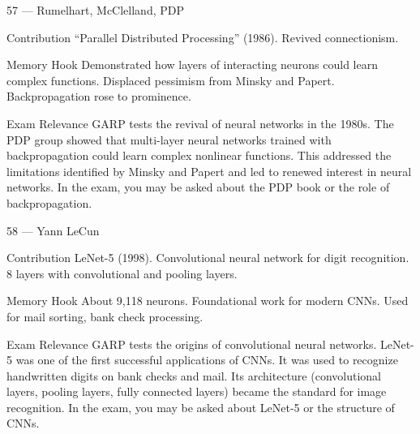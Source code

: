 \documentclass[aspectratio=169,8pt]{beamer}
\begin{document}
	\begin{frame}{57 --- Rumelhart, McClelland, PDP}
		\begin{block}{Contribution}
			``Parallel Distributed Processing'' (1986). Revived connectionism.
		\end{block}
		\begin{block}{Memory Hook}
			Demonstrated how layers of interacting neurons could learn complex functions. Displaced pessimism from Minsky and Papert. Backpropagation rose to prominence.
		\end{block}
		\begin{block}{Exam Relevance}
			GARP tests the revival of neural networks in the 1980s. The PDP group showed that multi-layer neural networks trained with backpropagation could learn complex nonlinear functions. This addressed the limitations identified by Minsky and Papert and led to renewed interest in neural networks. In the exam, you may be asked about the PDP book or the role of backpropagation.
		\end{block}
	\end{frame}
	
	\begin{frame}{58 --- Yann LeCun}
		\begin{block}{Contribution}
			LeNet-5 (1998). Convolutional neural network for digit recognition. 8 layers with convolutional and pooling layers.
		\end{block}
		\begin{block}{Memory Hook}
			About 9,118 neurons. Foundational work for modern CNNs. Used for mail sorting, bank check processing.
		\end{block}
		\begin{block}{Exam Relevance}
			GARP tests the origins of convolutional neural networks. LeNet-5 was one of the first successful applications of CNNs. It was used to recognize handwritten digits on bank checks and mail. Its architecture (convolutional layers, pooling layers, fully connected layers) became the standard for image recognition. In the exam, you may be asked about LeNet-5 or the structure of CNNs.
		\end{block}
	\end{frame}
	
\end{document}
